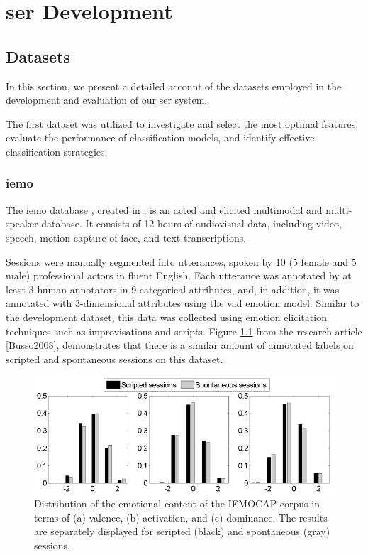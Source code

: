 \chapter{\ac{ser} Development}
\label{chapter:strat}

\section{Datasets}

In this section, we present a detailed account of the datasets employed in the development and evaluation of our \ac{ser} system.

The first dataset was utilized to investigate and select the most optimal features, evaluate the performance of classification models, and identify effective classification strategies.

\subsection{\ac{iemo}}

The \ac{iemo} database \cite{Busso2008}, created in \citeyear{Busso2008}, is an acted and elicited multimodal and multi-speaker database. It consists of 12 hours of audiovisual data, including video, speech, motion capture of face, and text transcriptions.

Sessions were manually segmented into utterances, spoken by 10 (5 female and 5 male) professional actors in fluent English. Each utterance was annotated by at least 3 human annotators in 9 categorical attributes, and, in addition, it was annotated with 3-dimensional attributes using the \ac{vad} emotion model. Similar to the development dataset, this data was collected using emotion elicitation techniques such as improvisations and scripts. Figure \ref{fig:bar_plots_distribution} from the research article \ref{Busso2008}, demonstrates that there is a similar amount of annotated labels on scripted and spontaneous sessions on this dataset.

\begin{figure}[H]
	\centering
	\includegraphics[width=.8\linewidth]{figs/4_1_traditional/scripted_spont_distribution.png}
	\caption{Distribution of the emotional content of the IEMOCAP corpus in terms of (a) valence, (b) activation, and (c) dominance. The results are separately displayed for scripted (black) and spontaneous (gray) sessions.}
	\label{fig:bar_plots_distribution}
\end{figure}


